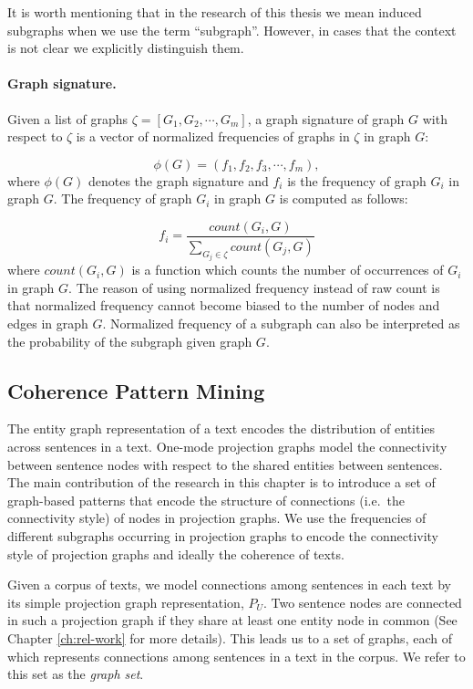It is worth mentioning that in the research of this thesis we mean induced subgraphs when we use the term ``subgraph''.  
However, in cases that the context is not clear we explicitly distinguish them. 

\paragraph{Graph signature.}
%
Given a list of graphs $ \zeta  = \left[ G_1, G_2, \cdots , G_m \right]$,  a graph signature of graph $G$ with respect to $\zeta$ is a vector of normalized frequencies of graphs in $\zeta$ in graph $G$:

\begin{equation}
	\phi \left( G \right) = \left( f_1, f_2, f_3, \cdots, f_m \right),
\end{equation}
where  $\phi \left( G \right)$ denotes the graph signature and $f_i$ is the frequency of graph $G_i$ in graph $G$. 
The frequency of graph $G_i$ in graph $G$ is computed as follows:

\begin{equation}
 f_i = \frac{count(G_i, G)}{\sum_{G_j \in \zeta}{count(G_j, G)}}
\end{equation}
where $count(G_i, G)$ is a function which counts the number of occurrences of $G_i$ in graph $G$. 
The reason of using normalized frequency instead of raw count is that normalized frequency cannot become biased to the number of nodes and edges in graph $G$. 
Normalized frequency of a subgraph can also be interpreted as the probability of the subgraph given graph $G$.  

\subsection{Coherence Pattern Mining}

The entity graph representation of a text encodes the distribution of entities across sentences in a text. 
One-mode projection graphs model the connectivity between sentence nodes with respect to the shared entities between sentences. 
The main contribution of the research in this chapter is to introduce a set of graph-based patterns that encode the structure of connections (i.e.\ the connectivity style) of nodes in projection graphs.  
We use the frequencies of different subgraphs occurring in projection graphs to encode the connectivity style of projection graphs and ideally the coherence of texts. 

Given a corpus of texts, we model connections among sentences in each text by its simple projection graph representation, $P_U$. 
Two sentence nodes are connected in such a projection graph if they share at least one entity node in common (See Chapter \ref{ch:rel-work} for more details).  
This leads us to a set of graphs, each of which represents connections among sentences in a text in the corpus.   
We refer to this set as the \emph{graph set}. 

